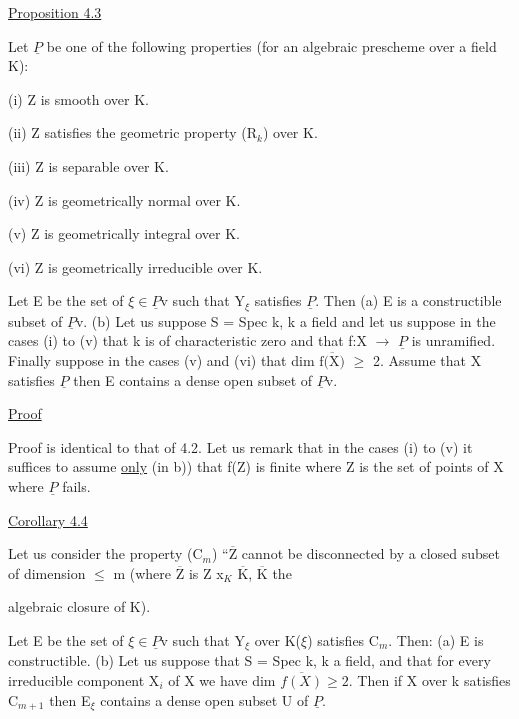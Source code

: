 \documentclass[11pt]{article}
\newcommand{\scanpage}[1]{\par\bigskip\noindent{\small\sffamily[scan #1]}\par}
\newcommand{\mspage}[1]{{\small\sffamily[p.\,#1]}}
\newcommand{\uline}[1]{\underline{#1}}
\begin{document}
\uline{Proposition 4.3}

Let $\underline{P}$ be one of the following properties (for an algebraic
prescheme over a field K):

(i) Z is smooth over K.

(ii) Z satisfies the geometric property (R$_{k}$) over K.

(iii) Z is separable over K.

(iv) Z is geometrically normal over K.

(v) Z is geometrically integral over K.

(vi) Z is geometrically irreducible over K.

Let E be the set of $\xi \in \underline{P}$v such that Y$_{\xi}$ satisfies $\underline{P}$. Then (a) E is
a constructible subset of $\underline{P}$v. (b) Let us suppose S = Spec k, k a
field and let us suppose in the cases (i) to (v) that k is of
characteristic zero and that f:X $\to$ $\underline{P}$ is unramified.
Finally suppose in the cases (v) and (vi) that dim $\overline{\text{f(X)}}$ $\geq$ 2.
Assume that X satisfies $\underline{P}$ then E contains a dense open subset of
$\underline{P}$v.

\uline{Proof}

Proof is identical to that of 4.2. Let us remark that in the
cases (i) to (v) it suffices to assume \uline{only} (in b)) that f(Z) is
finite where Z is the set of points of X where $\underline{P}$ fails.

\uline{Corollary 4.4}

Let us consider the property (C$_{m}$) ``$\overline{\text{Z}}$ cannot be disconnected
by a closed subset of dimension $\leq$ m (where $\overline{\text{Z}}$ is Z x$_{K}$ $\overline{\text{K}}$, $\overline{\text{K}}$ the

\clearpage
\scanpage{24/25}
\mspage{25}

algebraic closure of K).

Let E be the set of $\xi \in \underline{P}$v such that Y$_{\xi}$ over K($\xi$) satisfies
C$_{m}$. Then: (a) E is constructible. (b) Let us suppose that S =
Spec k, k a field, and that for every irreducible component X$_{i}$ of X
we have dim $\overline{f(X)} \geq 2$. Then if X over k satisfies C$_{m+1}$ then E$_{\xi}$
contains a dense open subset U of $\underline{P}$.
\end{document}
